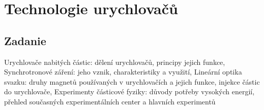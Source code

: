 \documentclass[../../main.tex]{subfiles}
\begin{document}
\section{Technologie urychlovačů}

\subsection{Zadanie}

Urychlovače nabitých částic: dělení urychlovačů, principy jejich funkce, Synchrotronové záření: jeho vznik, charakteristiky a využití, Lineární optika svazku: druhy magnetů používaných v urychlovačích a jejich funkce, injekce částic do urychlovače, Experimenty částicové fyziky: důvody potřeby vysokých energií, přehled současných experimentálních center a hlavních experimentů
\end{document}
